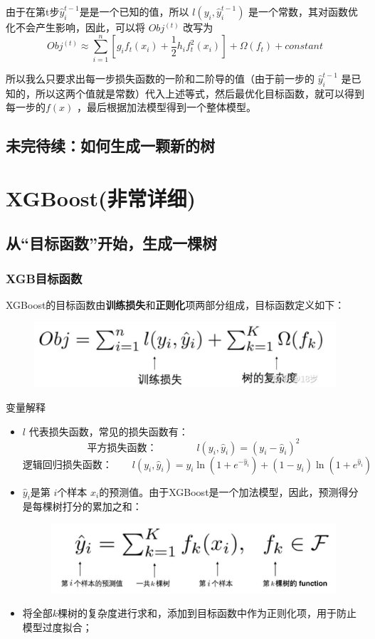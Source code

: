 \documentclass[12pt]{article}
\begin{document}
由于在第t步$\hat{y}_i^{t-1}$是是一个已知的值，所以 $l(y_i,\hat{y}_i^{t-1})$ 是一个常数，其对函数优化不会产生影响，因此，可以将 $Obj^{(t)}$ 改写为
$$
Obj^{(t)} \approx \sum_{i=1}^n[g_if_t(x_i) + \frac{1}{2}h_if_t^2(x_i)] + \Omega (f_t) + constant
$$

所以我么只要求出每一步损失函数的一阶和二阶导的值（由于前一步的 $\hat{y}_i^{t-1}$ 是已知的，所以这两个值就是常数）代入上述等式，然后最优化目标函数，就可以得到每一步的$f(x)$ ，最后根据加法模型得到一个整体模型。

\subsection{未完待续：如何生成一颗新的树}
\section{XGBoost(非常详细)\cite{Detail_Of_XGBoost_GBDT}\cite{Decision_Tree_XGBoost_LightGBM}}
\subsection{从“目标函数”开始，生成一棵树}
\subsubsection{XGB目标函数}
XGBoost的目标函数由\textbf{训练损失}和\textbf{正则化}项两部分组成，目标函数定义如下：
\begin{figure}[H]
    \centering
    \includegraphics[width=.8\textwidth]{fig/XGBoost_Eq_Objective.png}
\end{figure}

变量解释
\begin{itemize}
\setlength{\itemsep}{0pt}
\setlength{\parsep}{0pt}
\setlength{\parskip}{0pt}
    \item $l$ 代表损失函数，常见的损失函数有：
    $$
    \text{平方损失函数：} \qquad\qquad l(y_i, \hat{y}_i) = (y_i - \hat{y}_i)^2
    $$
    $$
    \text{逻辑回归损失函数：} \qquad l(y_i, \hat{y}_i) = y_i \ln (1+e^{-\hat{y}_i}) + (1-y_i)\ln (1+e^{\hat{y}_i})
    $$
    \item $\hat{y}_i$是第 $i$个样本 $x_i$的预测值。由于XGBoost是一个加法模型，因此，预测得分是每棵树打分的累加之和：
    \begin{figure}[H]
    \centering
    \includegraphics[width=.8\textwidth]{fig/XGBoost_Eq_Ith_Tree_Prediction.png}
\end{figure}
    \item 将全部$k$棵树的复杂度进行求和，添加到目标函数中作为正则化项，用于防止模型过度拟合；
\end{itemize}
\end{document}
